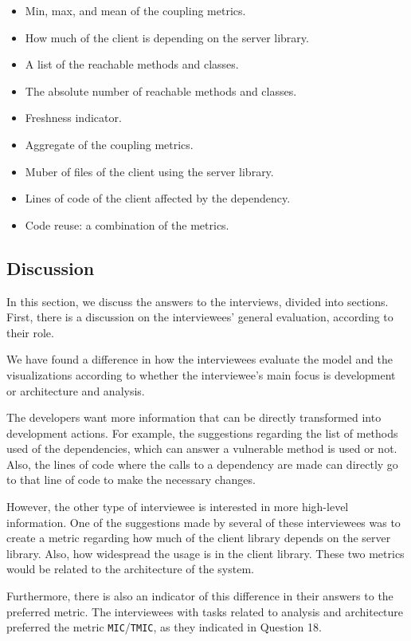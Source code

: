 \begin{itemize}
  \item Min, max, and mean of the coupling metrics.
  \item How much of the client is depending on the server library.
  \item A list of the reachable methods and classes.
  \item The absolute number of reachable methods and classes.
  \item Freshness indicator.
  \item Aggregate of the coupling metrics.
  \item Muber of files of the client using the server library.
  \item Lines of code of the client affected by the dependency.
  \item Code reuse: a combination of the metrics.
\end{itemize}

\subsection{Discussion}
In this section, we discuss the answers to the interviews, divided into sections. First, there is a discussion on the interviewees' general evaluation, according to their role.

We have found a difference in how the interviewees evaluate the model and the visualizations according to whether the interviewee's main focus is development or architecture and analysis.

The developers want more information that can be directly transformed into development actions. For example, the suggestions regarding the list of methods used of the dependencies, which can answer a vulnerable method is used or not. Also, the lines of code where the calls to a dependency are made can directly go to that line of code to make the necessary changes.

However, the other type of interviewee is interested in more high-level information. One of the suggestions made by several of these interviewees was to create a metric regarding how much of the client library depends on the server library. Also, how widespread the usage is in the client library. These two metrics would be related to the architecture of the system.

Furthermore, there is also an indicator of this difference in their answers to the preferred metric. The interviewees with tasks related to analysis and architecture preferred the metric \texttt{MIC}/\texttt{TMIC}, as they indicated in Question 18.

